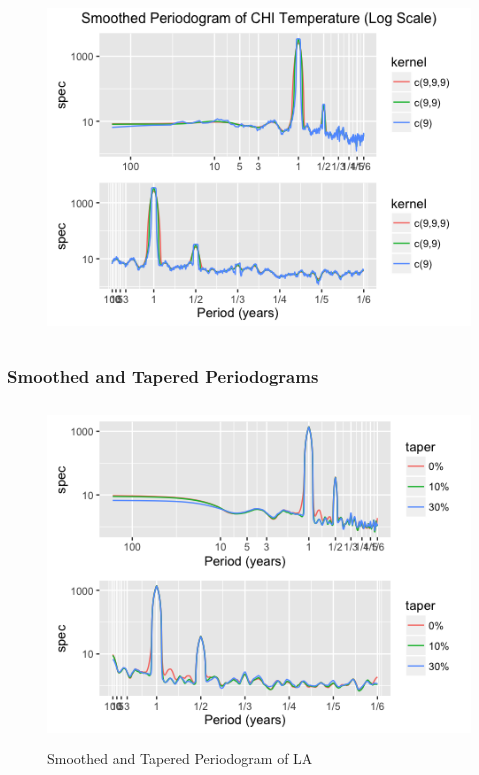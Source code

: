 \documentclass[12pt]{article}
\begin{document}
\begin{figure}[H]
    \includegraphics[width=\textwidth, height=9cm]{Figures/chiSmooth.png}
\end{figure}


\subsubsection{Smoothed and Tapered Periodograms} \label{sec:periodTaper}
\begin{figure}[H]
    \includegraphics[width=\textwidth, height=9cm]{Figures/laTaper.png}
    \caption{Smoothed and Tapered Periodogram of LA}
\end{figure}
\end{document}
